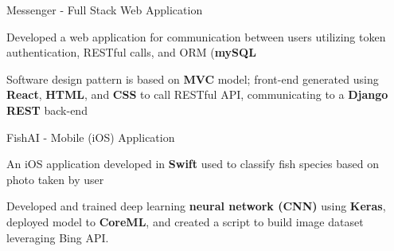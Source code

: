 \begin{siderulesProj}
\par\addvspace{-1.2ex}
\begin{cventriesproject}
  \cventryproject
    {Messenger - Full Stack Web Application}
    {
      \begin{cvskillitems}
        \item { Developed a web application for communication between users utilizing token authentication, RESTful calls, and ORM (\textbf{mySQL}}
        \item {Software design pattern is based on \textbf{MVC} model; front-end generated using \textbf{React}, \textbf{HTML}, and \textbf{CSS} to call RESTful API, communicating to a \textbf{Django REST} back-end}
      \end{cvskillitems}
    }
  \cventryproject
    {FishAI - Mobile (iOS) Application}
    {
      \begin{cvskillitems}
        \item {An iOS application developed in \textbf{Swift} used to classify fish species based on photo taken by user}
        \item {Developed and trained deep learning \textbf{neural network (CNN)} using \textbf{Keras}, deployed model to \textbf{CoreML}, and created a script to build image dataset leveraging Bing API.}
      \end{cvskillitems}
    }
\end{cventriesproject}
\end{siderulesProj}

